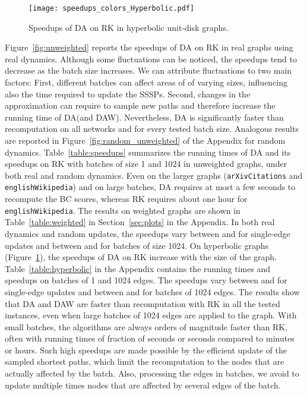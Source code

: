 \documentclass[english]{llncs}
\newcommand{\vd}{\xspace}
\newcommand{\rk}{\textsf{RK}\xspace}
\newcommand{\da}{\textsf{DA}\xspace}
\newcommand{\daw}{\textsf{DAW}\xspace}
\begin{document}
\begin{figure}[htb]
\begin{center}
\texttt{[image: speedups\_colors\_Hyperbolic.pdf]}
\caption{Speedups of \da on \rk in hyperbolic unit-disk graphs.}
\label{fig:hyp}
\end{center}
\end{figure}
Figure~\ref{fig:unweighted} reports the speedups of \da on \rk in real graphs using real dynamics. Although some fluctuations can be noticed, the speedups tend to decrease as the batch size increases. We can attribute fluctuations to two main factors: First, different batches can affect areas of  of varying sizes, influencing also the time required to update the SSSPs. Second, changes in the \vd approximation can require to sample new paths and therefore increase the running time of \da (and \daw). Nevertheless, \da is significantly faster than recomputation on all networks and for every tested batch size. Analogous results are reported in Figure~\ref{fig:random_unweighted} of the Appendix for random dynamics. Table~\ref{table:speedups} summarizes the running times of \da and its speedups on \rk with batches of size 1 and 1024 in unweighted graphs, under both real and random dynamics. Even on the larger graphs (\texttt{arXivCitations} and \texttt{englishWikipedia}) and on large batches, \da requires at most a few seconds to recompute the BC scores, whereas \rk requires about one hour for \texttt{englishWikipedia}. 
The results on weighted graphs are shown in Table~\ref{table:weighted} in Section~\ref{sec:plots} in the Appendix. In both real dynamics and random updates, the speedups vary between  and  for single-edge updates and between  and  for batches of size 1024.
On hyperbolic graphs (Figure~\ref{fig:hyp}), the speedups of \da on \rk increase with the size of the graph. Table~\ref{table:hyperbolic} in the Appendix contains the running times and speedups on batches of 1 and 1024 edges. The speedups vary between  and  for single-edge updates and between  and  for batches of 1024 edges. 
The results show that \da and \daw are faster than recomputation with \rk in all the tested instances, even when large batches of 1024 edges are applied to the graph. With small batches, the algorithms are always orders of magnitude faster than \rk, often with running times of fraction of seconds or seconds compared to minutes or hours. Such high speedups are made possible by the efficient update of the sampled shortest paths, which limit the recomputation to the nodes that are actually affected by the batch. Also, processing the edges in batches, we avoid to update multiple times nodes that are affected by several edges of the batch.
\end{document}
